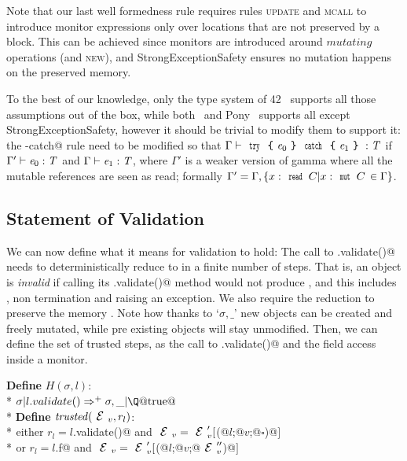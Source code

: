 
Note that our last well formedness rule requires 
rules \textsc{update} and \textsc{mcall} to introduce
monitor expressions only over locations
that are not preserved by a \Q@try@ block.
This can be achieved since monitors are introduced
around $\mathit{mutating}$ operations
(and \textsc{new}),
and StrongExceptionSafety ensures no mutation happens on the preserved memory.

To the best of our knowledge, only the type system of 42~\cite{ServettoEtAl13a,ServettoZucca15}
 supports all those assumptions out of the box,
while both~\cite{GordonEtAl12} and Pony~\cite{clebsch2015deny,clebsch2017orca} supports all except StrongExceptionSafety,
however it should be trivial to modify them to support it:
the \Q@try-catch@ rule need to be modified so that
$\Gamma\vdash\Kw{try}\oC\e_0\cC\Kw{catch}\oC\e_1\cC:\T$
if $\Gamma'\vdash\e_0:\T$ and $\Gamma\vdash\e_1:\T$,
where $\Gamma'$ is a weaker version of gamma where all the mutable
references are seen as read; formally $\Gamma'=\Gamma,\{x:\Kw{read}\,C | x:\Kw{mut}\,C\,\in\Gamma\}$.

\subsection{Statement of Validation}

\noindent We can now define what it means for validation to hold:
The call to \Q@.validate()@ needs to deterministically reduce to \Q@true@ in a finite number
of steps. 
That is, an object is \emph{invalid} if calling its \Q@.validate()@
method would not produce \Q@true@, and this includes \Q@false@, non termination and raising an exception.
We also require the reduction to preserve the memory \Q@sigma@.
Note how thanks to `$\sigma,\_ $' new objects can be created and freely mutated, while 
pre existing objects will stay unmodified.
Then, we can define the set of trusted steps, 
as the call to \Q@.validate()@ and the field access inside a monitor.

\noindent\textbf{Define} $H(\sigma,l)$:\\*
${}_{}$\quad\quad$\sigma | l.validate()\Rightarrow^+ \sigma,\_ | \text{\Q@true@}$\\*
\noindent\textbf{Define} $\mathit{trusted}(\ctx_v,r_l)$:\\*
${}_{}$\quad\quad either
$r_l=l$\Q@.validate()@ and
 $\ctx_v=\ctx_v'[$\Q@M(@$l$\Q@;@$v$\Q@;@$\square$\Q@)@$]$\\*
${}_{}$\quad\quad or
$r_l=l$\Q@.f@ and
 $\ctx_v=\ctx_v'[$\Q@M(@$l$\Q@;@$v$\Q@;@$\ctx_v''$\Q@)@$]$

